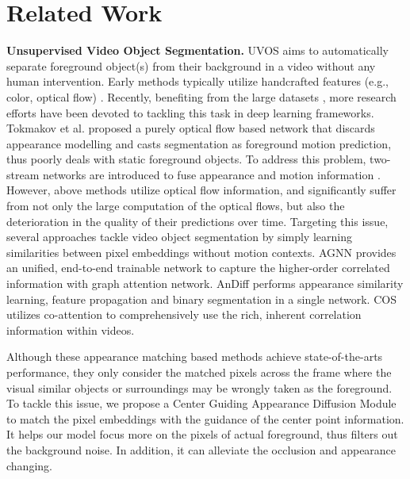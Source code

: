 \documentclass[letterpaper]{article} \usepackage{aaai20}  \usepackage{times}  \usepackage{helvet} \usepackage{courier}  \usepackage[hyphens]{url}  \usepackage{graphicx} \urlstyle{rm} \def\UrlFont{\rm}  \usepackage{graphicx}  \frenchspacing  \setlength{\pdfpagewidth}{8.5in}  \setlength{\pdfpageheight}{11in}  \usepackage{amssymb}
\newcommand{\ldz}[1]{\textcolor{black}{#1}}
\begin{document}
\section{Related Work}
\noindent \textbf{Unsupervised Video Object Segmentation.}
UVOS aims to automatically separate foreground object(s) from
their background in a video without any human intervention. 
Early methods typically utilize handcrafted features (e.g., color, optical flow) \cite{papazoglou2013fast,faktor2014video,tsai2016video,hu2018unsupervised}.
Recently, benefiting from the large datasets \cite{perazzi2016benchmark}, more research efforts have been devoted to tackling this task in deep learning frameworks.
Tokmakov et al. \cite{tokmakov2017learning} proposed
a purely optical flow based network that discards appearance modelling and casts segmentation as foreground motion prediction,
thus poorly deals with static foreground objects. To address this problem, two-stream networks are introduced to fuse appearance and motion information \cite{li2018flow,jain2017fusionseg,cheng2017segflow,li2018unsupervised,zhou2020motion}. However, above methods utilize optical flow information, and significantly suffer from not only the large computation of the optical flows, but also the deterioration in the quality of their predictions over time. 
Targeting this issue, several approaches \ldz{\cite{wang2019zero,yang2019anchor,lu2019see,chen2018blazingly,fathi2017semantic,li2018instance,oh2019video}} tackle video object segmentation by simply learning similarities between pixel embeddings without motion contexts. AGNN \cite{wang2019zero} provides an unified, end-to-end trainable network to capture the higher-order correlated information with graph attention network. AnDiff \cite{yang2019anchor} performs appearance similarity learning, feature propagation and binary segmentation in a single network. COS \cite{lu2019see} utilizes co-attention to comprehensively use the rich, inherent correlation information within videos.

Although these appearance matching based methods achieve state-of-the-arts performance, 
they only consider the matched pixels across the frame where the visual similar objects or surroundings may be wrongly taken as the foreground. To tackle this issue, we propose a Center Guiding Appearance Diffusion Module to match the pixel embeddings with the guidance of the center point information. It helps our model focus more on the pixels of actual foreground, thus filters out the background noise. In addition, it can alleviate the occlusion and appearance changing.
\end{document}
